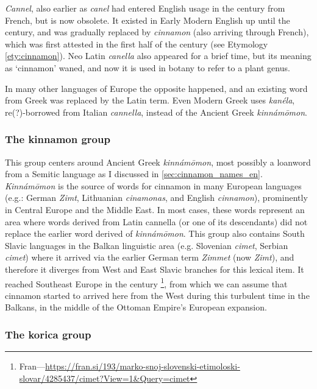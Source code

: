 \textit{\obs Cannel}, also earlier as \textit{canel} had entered English usage in the  century from French, but is now obsolete. It existed in Early Modern English up until the  century, and was gradually replaced by \textit{cinnamon} (also arriving through French), which was first attested in the first half of the  century (see Etymology \ref{ety:cinnamon}). Neo Latin \textit{canella} also appeared for a brief time, but its meaning as `cinnamon' waned, and now it is used in botany to refer to a plant genus.

In many other languages of Europe the opposite happened, and an existing word from Greek was replaced by the Latin term. Even Modern Greek uses \textit{kanéla}, re(?)-borrowed from Italian \textit{cannella}, instead of the Ancient Greek \textit{kinnámōmon}. 

\subsubsection{The kinnamon group}

This group centers around Ancient Greek \textit{kinnámōmon}, most possibly a loanword from a Semitic language as I discussed in \cref{sec:cinnamon_names_en}. \textit{Kinnámōmon} is the source of words for cinnamon in many European languages (e.g.: German \textit{Zimt}, Lithuanian \textit{cinamonas}, and English \textit{cinnamon}), prominently in Central Europe and the Middle East. In most cases, these words represent an area where words derived from Latin cannella (or one of its descendants) did not replace the earlier word derived of \textit{kinnámōmon}. This group also contains South Slavic languages in the Balkan linguistic area (e.g. Slovenian \textit{cimet}, Serbian  \textit{cimet}) where it arrived via the earlier German term \textit{Zimmet} (now \textit{Zimt}), and therefore it diverges from West and East Slavic branches for this lexical item. It reached Southeast Europe in the  century \autocite[cimet]{snoj_slovenski_1997}\footnote{Fran---\url{https://fran.si/193/marko-snoj-slovenski-etimoloski-slovar/4285437/cimet?View=1\&Query=cimet}}, from which we can assume that cinnamon started to arrived here from the West during this turbulent time in the Balkans, in the middle of the Ottoman Empire's European expansion.

\subsubsection{The korica group}

